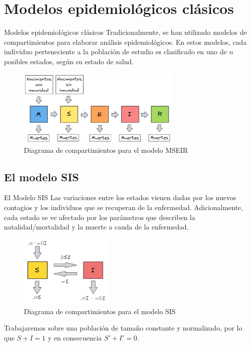 \documentclass[9pt]{beamer}
\begin{document}
\section{Modelos epidemiológicos clásicos}\label{sec:Modelos epidemiológicos clásicos}
\begin{frame}{Modelos epidemiológicos clásicos}
Tradicionalmente, se han utilizado modelos de compartimientos para elaborar análisis epidemiológicos. En estos modelos, cada individuo perteneciente a la población de estudio es clasificado en uno de $n$ posibles estados, según su estado de salud.\cite{modelCompartimental}

\begin{figure}[h]
  \centering
    \includegraphics[width=0.7\textwidth]{Imagenes/MSEIR_compatimientos.PNG}
  \caption{Diagrama de compartimientos para el modelo MSEIR}
  \label{fig:diagrama MSEIR}
\end{figure}
\end{frame}

\subsection{El modelo SIS}\label{sub:El modelo SIS}
\begin{frame}{El Modelo SIS}
Las variaciones entre los estados vienen dadas por los nuevos contagios y los individuos que se recuperan de la enfermedad. Adicionalmente, cada estado se ve afectado por los parámetros que describen la natalidad/mortalidad y la muerte a cauda de la enfermedad. 

\begin{figure}[h]
  \centering
    \includegraphics[width=0.4\textwidth]{Imagenes/SIS_compartimientos.PNG}
  \caption{Diagrama de compartimientos para el modelo SIS}
  \label{fig:diagrama SIS}
\end{figure}

Trabajaremos sobre una población de tamaño constante y normalizado, por lo que $S + I = 1$ y en consecuencia $S' + I' = 0$.
\end{frame}
\end{document}
